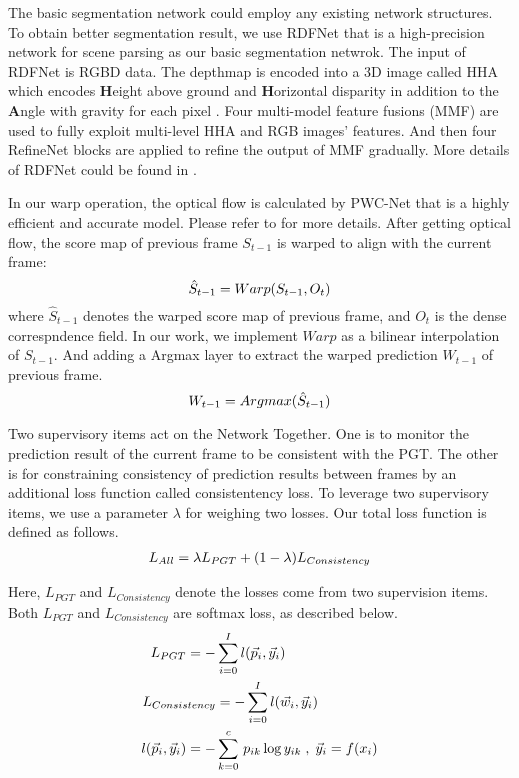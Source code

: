 The basic segmentation network could employ any existing network structures. 
%
To obtain better segmentation result, we use RDFNet\cite{Park2017} that is a high-precision network for scene parsing as our basic segmentation netwrok. 
%
The input of RDFNet is RGBD data. 
%
The depthmap is encoded into a 3D image called HHA \cite{Gupta2014} which encodes {\bf H}eight above ground and {\bf H}orizontal disparity in addition to the {\bf A}ngle with gravity for each pixel .
%
Four multi-model feature fusions (MMF) are used to fully exploit multi-level HHA and RGB images' features.
%
And then four RefineNet blocks are applied to refine the output of MMF gradually.
%
More details of RDFNet could be found in \cite{Park2017}. 

In our warp operation, the optical flow is calculated by PWC-Net \cite{Sun2018} that is a highly efficient and accurate model.
%
Please refer to \cite{Sun2018} for more details.
%
After getting optical flow, the score map of previous frame ${S_{t-1}}$ is warped to align with the current frame:
\begin{equation}
\centering
\hat{S}_{t-1}=Warp(S_{t-1},O_t)
\end{equation}
where ${\hat{S}_{t-1}}$ denotes the warped score map of previous frame, and ${O_t}$ is the dense correspndence field. 
%
In our work, we implement ${Warp}$ as a bilinear interpolation of $S_{t-1}$.
%
And adding a Argmax layer to extract the warped prediction ${W_{t-1}}$ of previous frame.
\begin{equation}
\centering
W_{t-1}=Argmax(\hat{S}_{t-1})
\end{equation}

Two supervisory items act on the Network Together.
%
One is to monitor the prediction result of the current frame to be consistent with the PGT.
%
The other is for constraining consistency of prediction results between frames by an additional loss function called consistentency loss. 
%
To leverage two supervisory items, we use a parameter ${\lambda}$ for weighing two losses. 
%
Our total loss function is defined as follows.
\begin{equation}
\centering
\begin{aligned}
L_{All}= \lambda L_{PGT} +(1-\lambda)L_{Consistency}
\end{aligned}
\end{equation}

Here, ${L_{PGT}}$ and ${L_{Consistency}}$ denote the losses come from two supervision items.
%
Both ${L_{PGT}}$ and ${L_{Consistency}}$ are softmax loss, as described below.
\begin{equation}
{
\vspace*{-0.6cm} 
\centering     
\begin{aligned}
L_{PGT} = -&\sum_{i=0}^Il(\vec p_i,\vec y_i) \\
L_{Consistency} &= -\sum_{i=0}^Il(\vec w_i,\vec y_i)\\
l(\vec p_i,\vec y_i) = -&\sum_{k=0}^c \,p_{ik}\log{y_{ik}}\;,\; \vec y_{i} = f(x_{i})\\
\end{aligned}
}
\end{equation}

